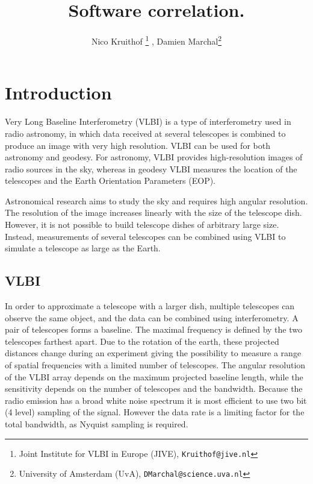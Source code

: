 \documentclass[12pt]{article}
\title{Software correlation.}
\author{Nico Kruithof
\footnote{Joint Institute for VLBI in Europe (JIVE),
  \texttt{Kruithof@jive.nl}}
, Damien Marchal\footnote{University of Amsterdam (UvA),
  \texttt{DMarchal@science.uva.nl}
}
}
\date{}
\begin{document}
\maketitle

%

\section{Introduction}
Very Long Baseline Interferometry (VLBI) \cite{VLBIbook} is a type of
interferometry used in radio astronomy, in which data received at
several telescopes is combined to produce an image with very high
resolution. VLBI can be used for both astronomy and geodesy.  For
astronomy, VLBI provides high-resolution images of radio sources in
the sky, whereas in geodesy VLBI measures the location of the
telescopes and the Earth Orientation Parameters (EOP).

Astronomical research aims to study the sky and requires high angular
resolution. The resolution of the image increases linearly with the
size of the telescope dish. However, it is not possible to build
telescope dishes of arbitrary large size.  Instead, measurements of
several telescopes can be combined using VLBI to simulate a telescope
as large as the Earth. 

\subsection{VLBI}
In order to approximate a telescope with a larger dish, multiple
telescopes can observe the same object, and the data can be combined
using interferometry. A pair of telescopes forms a baseline. The
maximal frequency is defined by the two telescopes farthest apart. Due
to the rotation of the earth, these projected distances change during
an experiment giving the possibility to measure a range of spatial
frequencies with a limited number of telescopes. The angular
resolution of the VLBI array depends on the maximum projected baseline
length, while the sensitivity depends on the number of telescopes and
the bandwidth. Because the radio emission has a broad white noise
spectrum it is most efficient to use two bit (4 level) sampling of the
signal. However the data rate is a limiting factor for the total
bandwidth, as Nyquist sampling is required.
\end{document}
